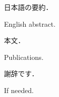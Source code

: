 \documentclass[master]{cimt}
\begin{document}
\maketitle

\frontmatter

\begin{jabstract}
  日本語の要約．
\end{jabstract}

\begin{eabstract}
  English abstract.
\end{eabstract}

\tableofcontents

\mainmatter

本文．

\backmatter

\pubUseLongName %
\begin{publications}
  \item Publications.
\end{publications}




\begin{acknowledgements}
  謝辞です．
\end{acknowledgements}

\appendix

If needed.
\end{document}
